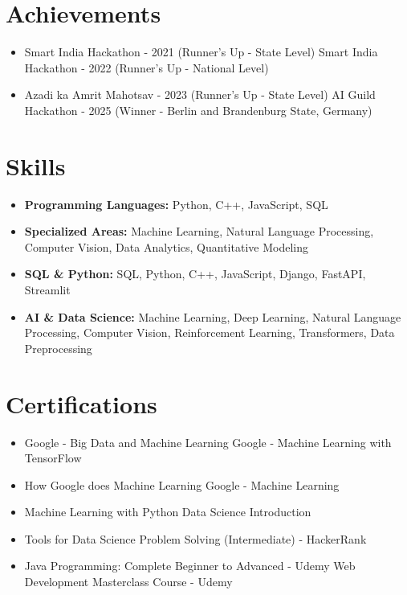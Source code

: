 \documentclass[a4paper,10pt]{article}
\begin{document}
\section*{Achievements}
\begin{itemize}
\item Smart India Hackathon - 2021 (Runner's Up - State Level) \hfill Smart India Hackathon - 2022 (Runner's Up - National Level)
\item Azadi ka Amrit Mahotsav - 2023 (Runner's Up - State Level) \hfill AI Guild Hackathon - 2025 (Winner - Berlin and Brandenburg State, Germany)
\end{itemize}

\section*{Skills}
\begin{itemize}
  \item \textbf{Programming Languages:} Python, C++, JavaScript, SQL
  \item \textbf{Specialized Areas:} Machine Learning, Natural Language Processing, Computer Vision, Data Analytics, Quantitative Modeling
  \item \textbf{SQL \& Python:} SQL, Python, C++, JavaScript, Django, FastAPI, Streamlit
  \item \textbf{AI \& Data Science:} Machine Learning, Deep Learning, Natural Language Processing, Computer Vision, Reinforcement Learning, Transformers, Data Preprocessing
\end{itemize}

\section*{Certifications}
\begin{itemize}
\item Google - Big Data and Machine Learning \hfill Google - Machine Learning with TensorFlow
\item How Google does Machine Learning \hfill Google - Machine Learning
\item Machine Learning with Python \hfill Data Science Introduction
\item Tools for Data Science \hfill Problem Solving (Intermediate) - HackerRank
\item Java Programming: Complete Beginner to Advanced - Udemy \hfill Web Development Masterclass Course - Udemy
\end{itemize}
\end{document}
